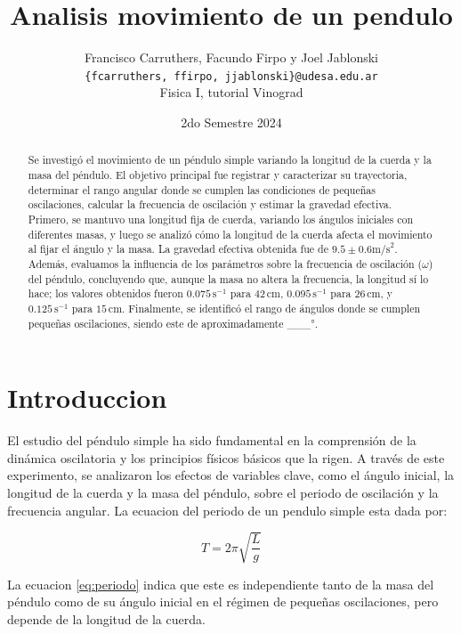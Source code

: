 \documentclass[12pt,a4]{article}
\title{Analisis movimiento de un pendulo}
\author{Francisco Carruthers, Facundo Firpo y Joel Jablonski\\ [2mm]
\small \texttt{\{fcarruthers, ffirpo, jjablonski\}@udesa.edu.ar}\\
\small Fisica I, tutorial Vinograd}
\date{2do Semestre 2024}
\begin{document}
\maketitle

\begin{abstract}
    Se investigó el movimiento de un péndulo simple variando la longitud de la cuerda y la masa del péndulo. El objetivo principal fue registrar y caracterizar su trayectoria, determinar el rango angular donde se cumplen las condiciones de pequeñas oscilaciones, calcular la frecuencia de oscilación y estimar la gravedad efectiva. Primero, se mantuvo una longitud fija de cuerda, variando los ángulos iniciales con diferentes masas, y luego se analizó cómo la longitud de la cuerda afecta el movimiento al fijar el ángulo y la masa. La gravedad efectiva obtenida fue de $9.5 \pm 0.6 \text{m/s}^2$. Además, evaluamos la influencia de los parámetros sobre la frecuencia de oscilación ($\omega$) del péndulo, concluyendo que, aunque la masa no altera la frecuencia, la longitud sí lo hace; los valores obtenidos fueron $0.075 \, \text{s}^{-1}$ para $42 \, \text{cm}$, $0.095 \, \text{s}^{-1}$ para $26 \, \text{cm}$, y $0.125 \, \text{s}^{-1}$ para $15 \, \text{cm}$. Finalmente, se identificó el rango de ángulos donde se cumplen pequeñas oscilaciones, siendo este de aproximadamente \_\_\_°.

\end{abstract}

\section{Introduccion}

El estudio del péndulo simple ha sido fundamental en la comprensión de la dinámica oscilatoria y los principios físicos básicos que la rigen. A través de este experimento, se analizaron los efectos de variables clave, como el ángulo inicial, la longitud de la cuerda y la masa del péndulo, sobre el periodo de oscilación y la frecuencia angular. La ecuacion del periodo de un pendulo simple esta dada por:

\begin{equation}
    T = 2 \pi \sqrt{\frac{L}{g}}
    \label{eq:periodo}
\end{equation}

La ecuacion \ref{eq:periodo} indica que este es independiente tanto de la masa del péndulo como de su ángulo inicial en el régimen de pequeñas oscilaciones, pero depende de la longitud de la cuerda.
\end{document}
